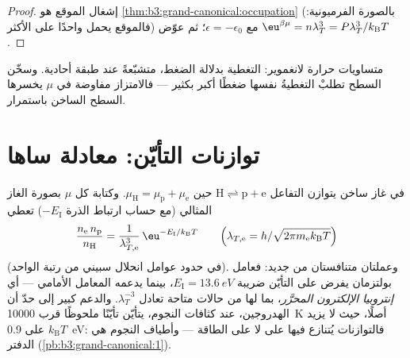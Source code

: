 \begin{proof}
إشغال الموقع هو
\cref{thm:b3:grand-canonical:occupation} (بالصورة الفرميونية: فالموقع
يحمل واحدًا على الأكثر) مع $\epsilon = -\epsilon_0$؛ ثم عوّض
$\eu^{\beta\mu} = n\lambda_T^3 = P\lambda_T^3/k_{\text{B}}T$.
\end{proof}

\begin{omfigure}

{\small متساويات حرارة لانغموير: التغطية بدلالة الضغط، متشبّعةً
عند طبقة أحادية. وسخّن السطح تطلبْ التغطيةُ نفسها ضغطًا
أكبر بكثير --- فالامتزاز مفاوضة في $\mu$ يخسرها السطح الساخن
باستمرار.}
\end{omfigure}

\section{توازنات التأيّن: معادلة ساها}

\begin{proposition}\label{prop:b3:grand-canonical:saha}
في غاز ساخن يتوازن التفاعل $\text{H} \rightleftharpoons \text{p} +
\text{e}$ حين $\mu_{\text{H}} = \mu_{\text{p}} +
\mu_{\text{e}}$. وكتابة كل $\mu$ بصورة الغاز المثالي (مع
حساب ارتباط الذرة $-E_{\text{I}}$) تعطي
\[
\frac{n_{\text{e}}\,n_{\text{p}}}{n_{\text{H}}}
 = \frac{1}{\lambda_{T,\text{e}}^3}\,
\eu^{-E_{\text{I}}/k_{\text{B}}T}
\qquad\Big(\lambda_{T,\text{e}} =
h/\sqrt{2\pi m_{\text{e}}k_{\text{B}}T}\Big)
\]
(في حدود عوامل انحلال سبيني من رتبة الواحد). وعملتان
متنافستان من جديد: فعامل بولتزمان يفرض على التأيّن ضريبة
$E_{\text{I}} = \qty{13.6}{eV}$، بينما يدعمه المعامل الأمامي --- أي
\emph{إنتروبيا الإلكترون المحرَّر}، بما لها من حالات متاحة
تعادل $\lambda_T^{-3}$. والدعم كبير إلى حدّ أن الهدروجين، عند
كثافات النجوم، يتأيّن تأيّنًا ملحوظًا
قرب \qty{10000}{K} أصلًا، حيث لا يزيد $k_{\text{B}}T$ على
\qty{0.9}{eV}: فالتوازنات يُتنازع فيها على  لا على الطاقة
--- وأطياف النجوم هي الدفتر
(\cref{pb:b3:grand-canonical:1}).
\end{proposition}

